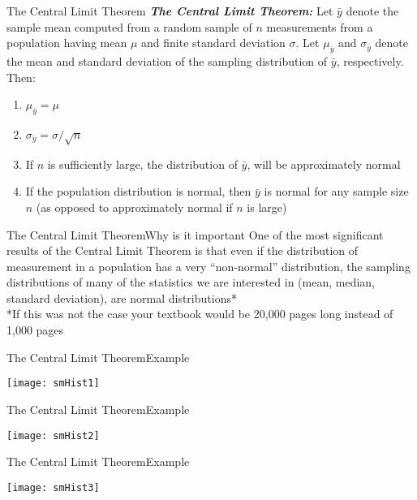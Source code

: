 \documentclass[xcolor=dvipsnames]{beamer}
\begin{document}
\begin{frame}{The Central Limit Theorem}
	\textbf{\emph{The Central Limit Theorem:}} Let $\bar{y}$ denote the sample mean computed from a random sample of $n$ measurements from a population having mean $\mu$ and finite standard deviation $\sigma$. Let $\mu_{\bar{y}}$ and $\sigma_{\bar{y}}$ denote the mean and standard deviation of the sampling distribution of $\bar{y}$, respectively. Then: \pause 
	\begin{enumerate}
		\item $\mu_{\bar{y}} = \mu$ \pause 
		\item $\sigma_{\bar{y}} = \sigma / \sqrt{n}$ \pause 
		\item If $n$ is sufficiently large, the distribution of $\bar{y}$, will be approximately normal \pause 
		\item If the population distribution is normal, then $\bar{y}$ is normal for any sample size $n$ (as opposed to approximately normal if $n$ is large)
	\end{enumerate}
\end{frame}

\begin{frame}{The Central Limit Theorem}{Why is it important}
	One of the most significant results of the Central Limit Theorem is that even if the distribution of measurement in a population has a very ``non-normal'' distribution, the sampling distributions of many of the statistics we are interested in (mean, median, standard deviation), are normal distributions* \\
	
	\vspace*{20 pt}
	*If this was not the case your textbook would be 20,000 pages long instead of 1,000 pages
\end{frame}

\begin{frame}{The Central Limit Theorem}{Example}
	\begin{center}
		\texttt{[image: smHist1]}
	\end{center}
\end{frame}

\begin{frame}{The Central Limit Theorem}{Example}
	\begin{center}
		\texttt{[image: smHist2]}
	\end{center}
\end{frame}

\begin{frame}{The Central Limit Theorem}{Example}
	\begin{center}
		\texttt{[image: smHist3]}
	\end{center}
\end{frame}
\end{document}
